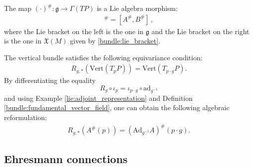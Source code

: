 
    \begin{property}
        The map $(\cdot)^\#:\mathfrak{g}\rightarrow\Gamma(TP)$ is a Lie algebra morphism:
        \begin{gather}
            [A,B]^\# = [A^\#,B^\#]\,,
        \end{gather}
        where the Lie bracket on the left is the one in $\mathfrak{g}$ and the Lie bracket on the right is the one in $\mathfrak{X}(M)$ given by \eqref{bundle:lie_bracket}.
    \end{property}

    \begin{property}
        The vertical bundle satisfies the following equivariance condition:
        \begin{gather}
            \label{bundle:vert_g_equivariance}
            R_{g,\ast}(\mathrm{Vert}(T_pP)) = \mathrm{Vert}(T_{p\cdot g}P).
        \end{gather}
        By differentiating the equality \[R_g\circ\iota_p = \iota_{p\cdot g}\circ\mathrm{ad}_{g^{-1}}\] and using Example \ref{lie:adjoint_representation} and Definition \ref{bundle:fundamental_vector_field}, one can obtain the following algebraic reformulation:
        \begin{gather}
            R_{g,\ast}\left(A^\#(p)\right) = \left(\mathrm{Ad}_{g^{-1}}A\right)^\#(p\cdot g).
        \end{gather}
    \end{property}

\subsection{Ehresmann connections}

